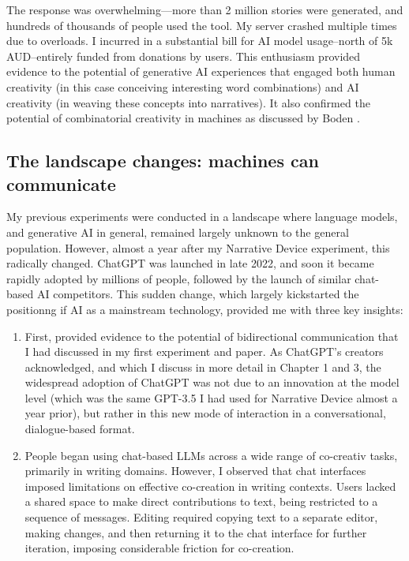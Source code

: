 The response was overwhelming—more than 2 million stories were generated, and hundreds of thousands of people used the tool. My server crashed multiple times due to overloads. I incurred in a substantial bill for AI model usage--north of 5k AUD--entirely funded from donations by users. This enthusiasm provided evidence to the potential of generative AI experiences that engaged both human creativity (in this case conceiving interesting word combinations) and AI creativity (in weaving these concepts into narratives). It also confirmed the potential of combinatorial creativity in machines as discussed by Boden \cite{Boden2003-hk}.

\subsection{The landscape changes: machines can communicate}

My previous experiments were conducted in a landscape where language models, and generative AI in general, remained largely unknown to the general population. However, almost a year after my Narrative Device experiment, this radically changed. ChatGPT was launched in late 2022, and soon it became rapidly adopted by millions of people, followed by the launch of similar chat-based AI competitors. This sudden change, which largely kickstarted the positionng if AI as a mainstream technology, provided me with three key insights:

\begin{enumerate}
    \item First, provided evidence to the potential of bidirectional communication that I had discussed in my first experiment and paper. As ChatGPT's creators acknowledged, and which I discuss in more detail in Chapter 1 and 3, the widespread adoption of ChatGPT was not due to an innovation at the model level (which was the same GPT-3.5 I had used for Narrative Device almost a year prior), but rather in this new mode of interaction in a conversational, dialogue-based format.
    \item People began using chat-based LLMs across a wide range of co-creativ tasks, primarily in writing domains. However, I observed that chat interfaces imposed limitations on effective co-creation in writing contexts. Users lacked a shared space to make direct contributions to text, being restricted to a sequence of messages. Editing required copying text to a separate editor, making changes, and then returning it to the chat interface for further iteration, imposing considerable friction for co-creation.
\end{enumerate}

